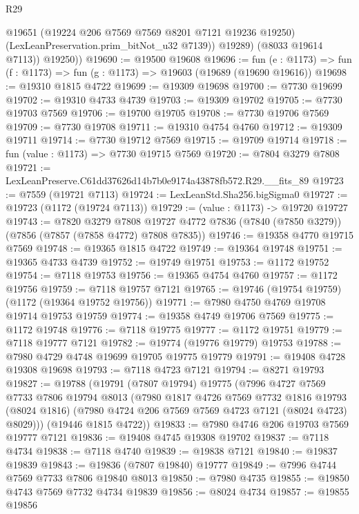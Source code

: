 \begin{lexlean}{R29}
\begin{coremodule}
              @19651
              (@19224 @206 @7569 @7569 @8201 @7121 @19236 @19250)
              (LexLeanPreservation.prim_bitNot_u32 @7139))
            @19289)
          (@8033 @19614 @7113))
        @19250))
@19690 := @19500 @19608
@19696 := fun (e : @1173) => fun (f : @1173) => fun (g : @1173) => @19603 (@19689 (@19690 @19616))
@19698 := @19310 @1815 @4722
@19699 := @19309 @19698
@19700 := @7730 @19699
@19702 := @19310 @4733 @4739
@19703 := @19309 @19702
@19705 := @7730 @19703 @7569
@19706 := @19700 @19705
@19708 := @7730 @19706 @7569
@19709 := @7730 @19708
@19711 := @19310 @4754 @4760
@19712 := @19309 @19711
@19714 := @7730 @19712 @7569
@19715 := @19709 @19714
@19718 := fun (value : @1173) => @7730 @19715 @7569
@19720 := @7804 @3279 @7808
@19721 := LexLeanPreserve.C61dd37626d14b7b0e9174a43878fb572.R29.__fits_89
@19723 := @7559 (@19721 @7113)
@19724 := LexLeanStd.Sha256.bigSigma0
@19727 := @19723 (@1172 (@19724 @7113))
@19729 := (value : @1173) -> @19720 @19727
@19743 := @7820
    @3279
    @7808
    @19727
    @4772
    @7836
    (@7840 (@7850 @3279))
    (@7856 (@7857 (@7858 @4772) @7808 @7835))
@19746 := @19358 @4770 @19715 @7569
@19748 := @19365 @1815 @4722
@19749 := @19364 @19748
@19751 := @19365 @4733 @4739
@19752 := @19749 @19751
@19753 := @1172 @19752
@19754 := @7118 @19753
@19756 := @19365 @4754 @4760
@19757 := @1172 @19756
@19759 := @7118 @19757 @7121
@19765 := @19746 (@19754 @19759) (@1172 (@19364 @19752 @19756))
@19771 := @7980 @4750 @4769 @19708 @19714 @19753 @19759
@19774 := @19358 @4749 @19706 @7569
@19775 := @1172 @19748
@19776 := @7118 @19775
@19777 := @1172 @19751
@19779 := @7118 @19777 @7121
@19782 := @19774 (@19776 @19779) @19753
@19788 := @7980 @4729 @4748 @19699 @19705 @19775 @19779
@19791 := @19408 @4728 @19308 @19698
@19793 := @7118 @4723 @7121
@19794 := @8271 @19793
@19827 := @19788
    (@19791
      (@7807 @19794)
      @19775
      (@7996
        @4727
        @7569
        @7733
        @7806
        @19794
        @8013
        (@7980
          @1817
          @4726
          @7569
          @7732
          @1816
          @19793
          (@8024 @1816)
          (@7980 @4724 @206 @7569 @7569 @4723 @7121 (@8024 @4723) @8029)))
      (@19446 @1815 @4722))
@19833 := @7980 @4746 @206 @19703 @7569 @19777 @7121
@19836 := @19408 @4745 @19308 @19702
@19837 := @7118 @4734
@19838 := @7118 @4740
@19839 := @19838 @7121
@19840 := @19837 @19839
@19843 := @19836 (@7807 @19840) @19777
@19849 := @7996 @4744 @7569 @7733 @7806 @19840 @8013
@19850 := @7980 @4735
@19855 := @19850 @4743 @7569 @7732 @4734 @19839
@19856 := @8024 @4734
@19857 := @19855 @19856

\end{coremodule}
\end{lexlean}
